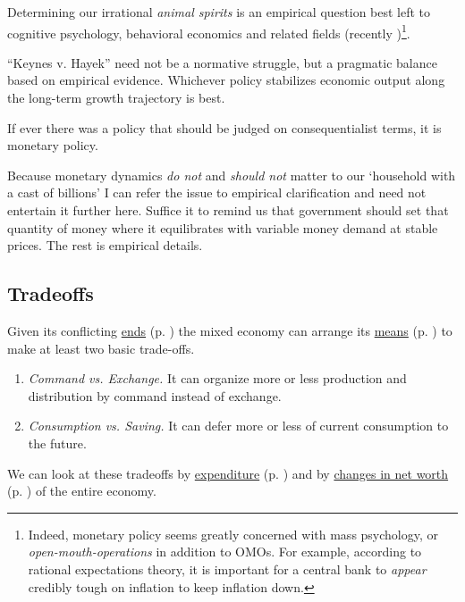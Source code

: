 \begin{enumerate}
	Determining our irrational \emph{animal spirits} \citep{Keynes1936} is an empirical question best left to cognitive psychology, behavioral economics and related fields (recently \citealt{Akerlof2010})\footnote{
		Indeed, monetary policy seems greatly concerned with mass psychology, or \emph{open-mouth-operations} in addition to \gls{OMO}s. For example, according to rational expectations theory, it is important for a central bank to \emph{appear} credibly tough on inflation to keep inflation down.}. 
	
	``Keynes v. Hayek'' \citep{Wapshott2011} need not be a normative struggle, but a pragmatic balance based on empirical evidence. Whichever policy stabilizes economic output along the long-term growth trajectory is best. 
	
	If ever there was a policy that should be judged on consequentialist terms, it is monetary policy.
\end{enumerate}

Because monetary dynamics \emph{do not} and \emph{should not} matter to our `household with a cast of billions' I can refer the issue to empirical clarification and need not entertain it further here. Suffice it to remind us that government should set that quantity of money where it equilibrates with variable money demand at stable prices. The rest is empirical details.

\subsection[Tradeoffs]{Tradeoffs} \label{sec:tradeoffs} Given its conflicting \hyperref[sec:ends]{ends} (p. \pageref{sec:ends}) the mixed economy can arrange its \hyperref[sec:means]{means} (p. \pageref{sec:means}) to make at least two basic trade-offs. 
\begin{enumerate}
	\item \emph{Command vs. Exchange.} It can organize more or less production and distribution by command instead of exchange. 
	\item \emph{Consumption vs. Saving.} It can defer more or less of current consumption to the future. 
\end{enumerate}	
	
We can look at these tradeoffs by \hyperref[sec:by_expenditure]{expenditure} (p. \pageref{sec:by_expenditure}) and by \hyperref[sec:delta_net_worth]{changes in net worth} (p. \pageref{sec:delta_net_worth}) of the entire economy. 


